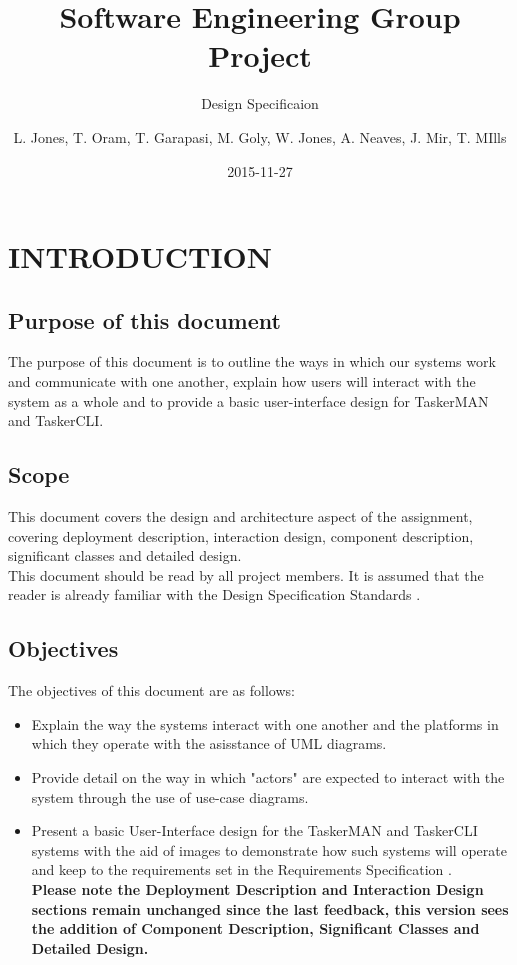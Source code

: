 \documentclass{project}
\begin{document}
\title{Software Engineering Group Project}
\subtitle{Design Specificaion}
\author{L. Jones, T. Oram, T. Garapasi, M. Goly, W. Jones, A. Neaves, J. Mir, T. MIlls}     
\date{2015-11-27}
\maketitle
\tableofcontents
\newpage
\section{INTRODUCTION}
\subsection{Purpose of this document}
The purpose of this document is to outline the ways in which our systems work and communicate with one another, explain how users will interact with the system as a whole and to provide a basic user-interface design for TaskerMAN and TaskerCLI.
\subsection{Scope}
This document covers the design and architecture aspect of the assignment, covering deployment description, interaction design, component description, significant classes and detailed design. \\
\newline
This document should be read by all project members. It is assumed that the reader is already familiar with the Design Specification Standards \cite{se.qa.ds}.
\subsection{Objectives}
The objectives of this document are as follows:
\begin{itemize}
	\item Explain the way the systems interact with one another and the platforms in which they operate with the asisstance of UML diagrams.
	\item Provide detail on the way in which "actors" are expected to interact with the system through the use of use-case diagrams.
	\item Present a basic User-Interface design for the TaskerMAN and TaskerCLI systems with the aid of images to demonstrate how such systems will operate and keep to the requirements set in the Requirements Specification \cite{se.qa.rs}. \\
	
\textbf{Please note the Deployment Description and Interaction Design sections remain unchanged since the last feedback, this version sees the addition of Component Description, Significant Classes and Detailed Design.}	
\end{itemize} 
\clearpage
\end{document}
